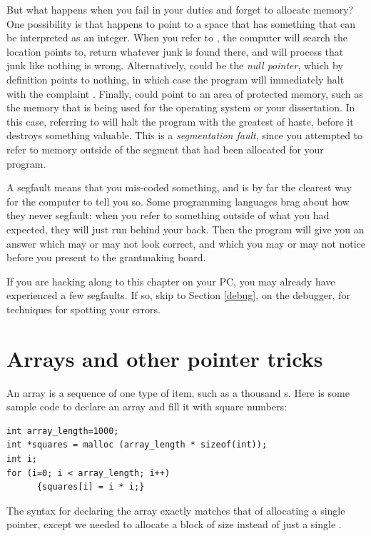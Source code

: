 \documentclass[12pt]{article}
\begin{document}
But what happens when you fail in your duties and forget to allocate
memory? One possibility is that  happens to point to a space
that has something that can be interpreted as an integer. When you refer
to , the computer will search the location 
points to, return whatever junk is found there, and will process that
junk like nothing is wrong. Alternatively,  could be the
{\sl null pointer},  which by definition points to nothing, in which
case the program will immediately halt with the complaint . Finally,  could point to an area of
protected memory, such as the memory that is being used for the operating
system or your dissertation. In this case, referring to  will
halt the program with the greatest of haste, before it destroys something
valuable. This is a {\sl segmentation fault}, since you attempted to refer
to memory outside of the segment that had been allocated for your program.

A segfault means that you mis-coded something, and 
is by far the clearest way for the computer to tell you so. Some
programming languages
brag about how they never segfault: when you refer to something
outside of what you had expected, they will just
run  behind your
back. Then the program will give you an answer which may or may not look
correct, and which you may or may not notice before you present to the
grantmaking board. 

If you are hacking along to this chapter on your PC, you may already
have experienced a few segfaults. If so, skip to 
Section \ref{debug}, on the debugger, for techniques for spotting your
errors.

\section{Arrays and other pointer tricks} \label{for_loops} 
An array is a sequence of one type of item, such as a thousand s. Here is some sample code to declare an array and fill it with square numbers:
\begin{lstlisting}
int array_length=1000;
int *squares = malloc (array_length * sizeof(int));
int i;
for (i=0; i < array_length; i++)
      {squares[i] = i * i;}
\end{lstlisting}

The syntax for declaring the array exactly match\-es that of allocating
a single pointer, except we need\-ed to allocate a block of size 
 instead of just a single . 
\end{document}
